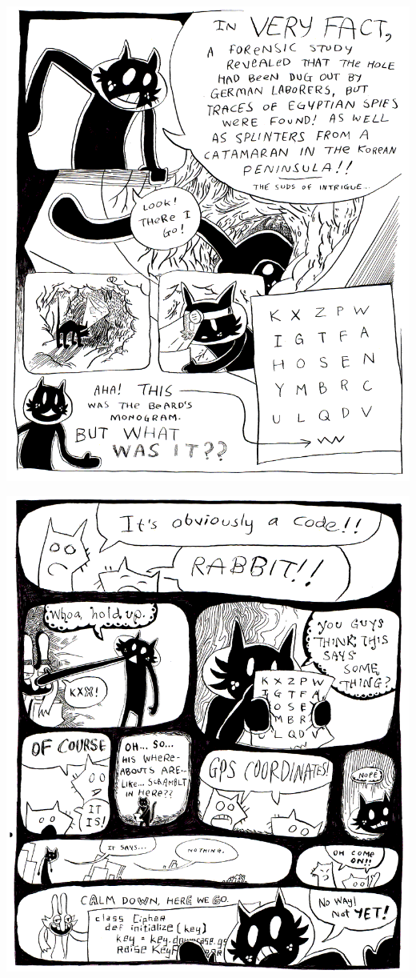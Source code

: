 \documentclass[10pt,twoside]{report}
\begin{document}
\vspace*{0.6cm} \includegraphics[width=1.0\textwidth]{cache/94.png}
\newpage

\vspace*{0.6cm} \includegraphics[width=1.0\textwidth]{cache/95.png}
\newpage
\end{document}
